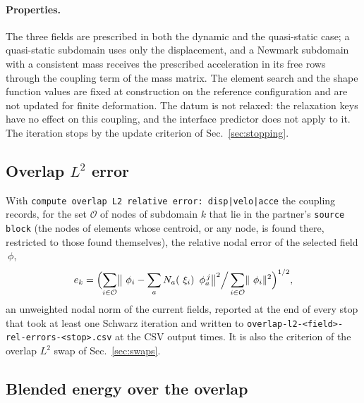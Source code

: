 \documentclass[11pt]{article}
\newcommand{\norm}[1]{\lVert #1 \rVert}
\newcommand{\code}[1]{\texttt{#1}}
\begin{document}
\paragraph{Properties.} The three fields are prescribed in both the
dynamic and the quasi-static case; a quasi-static subdomain uses only the
displacement, and a Newmark subdomain with a consistent mass receives the
prescribed acceleration in its free rows through the coupling term of the
mass matrix. The element search and the shape function values are fixed
at construction on the reference configuration and are not updated for
finite deformation. The datum is not relaxed: the relaxation keys have no
effect on this coupling, and the interface predictor does not apply to it.
The iteration stops by the update criterion of
Sec.~\ref{sec:stopping}.

\subsection{Overlap \texorpdfstring{$L^2$}{L2} error}
\label{sec:overlap-l2}

With \code{compute overlap L2 relative error: disp|velo|acce} the
coupling records, for the set $\mathcal{O}$ of nodes of subdomain $k$
that lie in the partner's \code{source block} (the nodes of elements whose
centroid, or any node, is found there, restricted to those found
themselves), the relative nodal error of the selected field $~\phi$,
\begin{equation}
  e_k = \Bigl( \sum_{i \in \mathcal{O}} \bigl\lVert ~\phi_i
        - \sum_a N_a(~\xi_i)\, ~\phi^{\,j}_a \bigr\rVert^2
        \Big/ \sum_{i \in \mathcal{O}} \norm{~\phi_i}^2 \Bigr)^{1/2},
  \label{eq:overlap-l2}
\end{equation}
an unweighted nodal norm of the current fields, reported at the end of
every stop that took at least one Schwarz iteration and written to
\code{overlap-l2-<field>-rel-errors-<stop>.csv} at the CSV output times.
It is also the criterion of the overlap $L^2$ swap of
Sec.~\ref{sec:swaps}.

\subsection{Blended energy over the overlap}
\label{sec:blended}
\end{document}
